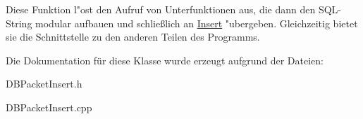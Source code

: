Diese Funktion l"ost den Aufruf von Unterfunktionen aus, die dann den S\-Q\-L-\/\-String modular aufbauen und schließlich an \hyperlink{classInsert}{Insert} "ubergeben. Gleichzeitig bietet sie die Schnittstelle zu den anderen Teilen des Programms. 

Die Dokumentation für diese Klasse wurde erzeugt aufgrund der Dateien\-:\begin{DoxyCompactItemize}
\item 
D\-B\-Packet\-Insert.\-h\item 
D\-B\-Packet\-Insert.\-cpp\end{DoxyCompactItemize}
